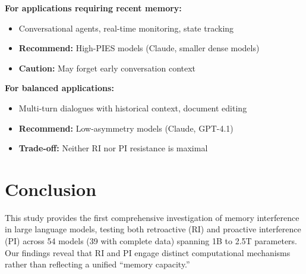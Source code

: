 \documentclass{article}
\begin{document}
\textbf{For applications requiring recent memory:}
\begin{itemize}[itemsep=1pt,topsep=2pt,parsep=0pt]
    \item Conversational agents, real-time monitoring, state tracking
    \item \textbf{Recommend:} High-PIES models (Claude, smaller dense models)
    \item \textbf{Caution:} May forget early conversation context
\end{itemize}

\textbf{For balanced applications:}
\begin{itemize}[itemsep=1pt,topsep=2pt,parsep=0pt]
    \item Multi-turn dialogues with historical context, document editing
    \item \textbf{Recommend:} Low-asymmetry models (Claude, GPT-4.1)
    \item \textbf{Trade-off:} Neither RI nor PI resistance is maximal
\end{itemize}

\section{Conclusion}

This study provides the first comprehensive investigation of memory interference in large language models, testing both retroactive (RI) and proactive interference (PI) across 54 models (39 with complete data) spanning 1B to 2.5T parameters. Our findings reveal that RI and PI engage distinct computational mechanisms rather than reflecting a unified ``memory capacity.''
\end{document}
